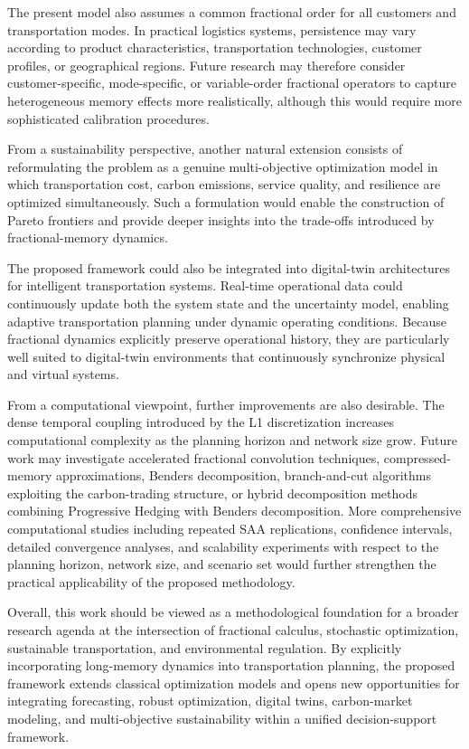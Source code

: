 The present model also assumes a common fractional order for all customers and transportation modes. In practical logistics systems, persistence may vary according to product characteristics, transportation technologies, customer profiles, or geographical regions. Future research may therefore consider customer-specific, mode-specific, or variable-order fractional operators to capture heterogeneous memory effects more realistically, although this would require more sophisticated calibration procedures.

From a sustainability perspective, another natural extension consists of reformulating the problem as a genuine multi-objective optimization model in which transportation cost, carbon emissions, service quality, and resilience are optimized simultaneously. Such a formulation would enable the construction of Pareto frontiers and provide deeper insights into the trade-offs introduced by fractional-memory dynamics.

The proposed framework could also be integrated into digital-twin architectures for intelligent transportation systems. Real-time operational data could continuously update both the system state and the uncertainty model, enabling adaptive transportation planning under dynamic operating conditions. Because fractional dynamics explicitly preserve operational history, they are particularly well suited to digital-twin environments that continuously synchronize physical and virtual systems.

From a computational viewpoint, further improvements are also desirable. The dense temporal coupling introduced by the L1 discretization increases computational complexity as the planning horizon and network size grow. Future work may investigate accelerated fractional convolution techniques, compressed-memory approximations, Benders decomposition, branch-and-cut algorithms exploiting the carbon-trading structure, or hybrid decomposition methods combining Progressive Hedging with Benders decomposition. More comprehensive computational studies including repeated SAA replications, confidence intervals, detailed convergence analyses, and scalability experiments with respect to the planning horizon, network size, and scenario set would further strengthen the practical applicability of the proposed methodology.

Overall, this work should be viewed as a methodological foundation for a broader research agenda at the intersection of fractional calculus, stochastic optimization, sustainable transportation, and environmental regulation. By explicitly incorporating long-memory dynamics into transportation planning, the proposed framework extends classical optimization models and opens new opportunities for integrating forecasting, robust optimization, digital twins, carbon-market modeling, and multi-objective sustainability within a unified decision-support framework.